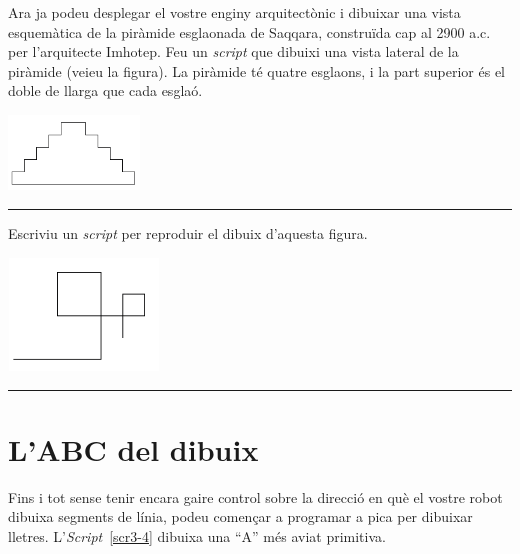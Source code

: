 \begin{center}
\colorbox{black}{}
\end{center}
{\small
\noindent
Ara ja podeu desplegar el vostre enginy arquitectònic i dibuixar una vista esquemàtica de la piràmide esglaonada de Saqqara, construïda cap al 2900 a.c. per l'arquitecte Imhotep. Feu un \emph{script} que dibuixi una vista lateral de la piràmide (veieu la figura). La piràmide té quatre esglaons, i la part superior és el doble de llarga que cada esglaó.}
\begin{center}
\includegraphics[height=20mm ,width=35mm]{Imatges/figuraE3-5.png}
\end{center}
\vspace*{-1mm}
\noindent
\rule{\textwidth}{3pt}

\begin{center}
\colorbox{black}{}
\end{center}
{\small
\noindent
Escriviu un \emph{script} per reproduir el dibuix d'aquesta figura.}
\begin{center}
\includegraphics[height=30mm ,width=40mm]{Imatges/figuraE3-6.png}
\end{center}
\noindent
\rule{\textwidth}{3pt}

\section{L'ABC del dibuix}
Fins i tot sense tenir encara gaire control sobre la direcció en què el vostre robot dibuixa segments de línia, podeu començar a programar a \textsf{pica} per dibuixar lletres. L'\emph{Script}~\ref{scr3-4} dibuixa una ``A'' més aviat primitiva.

